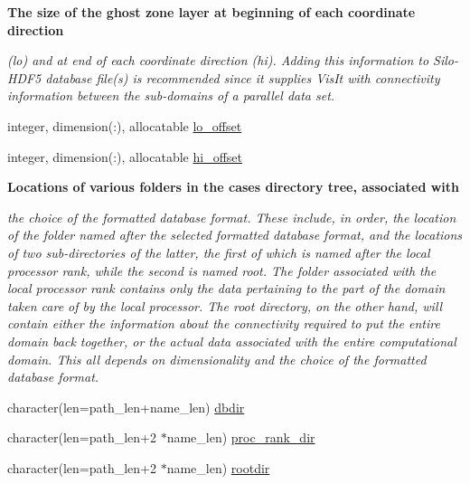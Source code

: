 \begin{Indent}\textbf{ The size of the ghost zone layer at beginning of each coordinate direction}\par
{\em (lo) and at end of each coordinate direction (hi). Adding this information to Silo-\/\+H\+D\+F5 database file(s) is recommended since it supplies Vis\+It with connectivity information between the sub-\/domains of a parallel data set. }\begin{DoxyCompactItemize}
\item 
integer, dimension(\+:), allocatable \hyperlink{namespacem__data__output_a4b7e6567b3bb7fdd4384180d1a7475af}{lo\+\_\+offset}
\item 
integer, dimension(\+:), allocatable \hyperlink{namespacem__data__output_a1a779679774e1161511609f18e8d9c27}{hi\+\_\+offset}
\end{DoxyCompactItemize}
\end{Indent}
\begin{Indent}\textbf{ Locations of various folders in the case\textquotesingle{}s directory tree, associated with}\par
{\em the choice of the formatted database format. These include, in order, the location of the folder named after the selected formatted database format, and the locations of two sub-\/directories of the latter, the first of which is named after the local processor rank, while the second is named \textquotesingle{}root\textquotesingle{}. The folder associated with the local processor rank contains only the data pertaining to the part of the domain taken care of by the local processor. The root directory, on the other hand, will contain either the information about the connectivity required to put the entire domain back together, or the actual data associated with the entire computational domain. This all depends on dimensionality and the choice of the formatted database format. }\begin{DoxyCompactItemize}
\item 
character(len=path\+\_\+len+name\+\_\+len) \hyperlink{namespacem__data__output_a5b3bbbc3392c3196bee8219d550fd9aa}{dbdir}
\item 
character(len=path\+\_\+len+2 $\ast$name\+\_\+len) \hyperlink{namespacem__data__output_a135059f1848c713ebe5156659da1929a}{proc\+\_\+rank\+\_\+dir}
\item 
character(len=path\+\_\+len+2 $\ast$name\+\_\+len) \hyperlink{namespacem__data__output_ae33b2fd4aa2594f18dd34e20b66813bb}{rootdir}
\end{DoxyCompactItemize}
\end{Indent}
